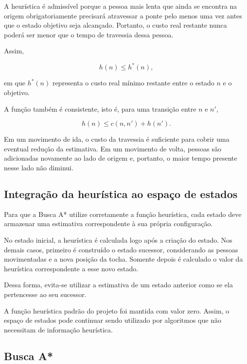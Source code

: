 A heurística é admissível porque a pessoa mais lenta que ainda se encontra na
origem obrigatoriamente precisará atravessar a ponte pelo menos uma vez antes
que o estado objetivo seja alcançado. Portanto, o custo real restante nunca
poderá ser menor que o tempo de travessia dessa pessoa.

Assim,

\begin{equation}
	h(n) \leq h^*(n),
\end{equation}

em que $h^*(n)$ representa o custo real mínimo restante entre o estado $n$ e
o objetivo.

A função também é consistente, isto é, para uma transição entre $n$ e $n'$,

\begin{equation}
	h(n) \leq c(n,n') + h(n').
\end{equation}

Em um movimento de ida, o custo da travessia é suficiente para cobrir uma
eventual redução da estimativa. Em um movimento de volta, pessoas são
adicionadas novamente ao lado de origem e, portanto, o maior tempo presente
nesse lado não diminui.

\subsection{Integração da heurística ao espaço de estados}

Para que a Busca A* utilize corretamente a função heurística, cada estado deve
armazenar uma estimativa correspondente à sua própria configuração.

No estado inicial, a heurística é calculada logo após a criação do estado. Nos
demais casos, primeiro é construído o estado sucessor, considerando as pessoas
movimentadas e a nova posição da tocha. Somente depois é calculado o valor da
heurística correspondente a esse novo estado.

Dessa forma, evita-se utilizar a estimativa de um estado anterior como se ela
pertencesse ao seu sucessor.

A função heurística padrão do projeto foi mantida com valor zero. Assim, o
espaço de estados pode continuar sendo utilizado por algoritmos que não
necessitam de informação heurística.

\subsection{Busca A*}

